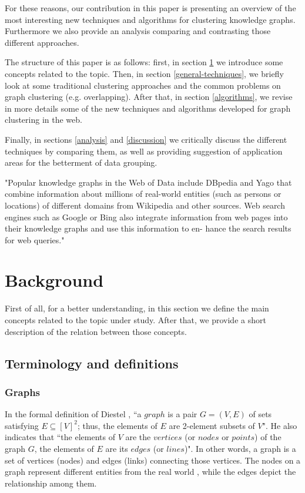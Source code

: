 \documentclass[runningheads]{llncs}
\begin{document}
For these reasons, our contribution in this paper is presenting an overview of the most interesting new techniques and algorithms for clustering knowledge graphs. Furthermore we also provide an analysis comparing and contrasting those different approaches.

The structure of this paper is as follows: first, in section \ref{background} we introduce some concepts related to the topic. Then, in section \ref{general-techniques}, we briefly look at some traditional clustering approaches and the common problems on graph clustering (e.g. overlapping). After that, in section \ref{algorithms}, we revise in more details some of the new techniques and algorithms developed for graph clustering in the web.

Finally, in sections \ref{analysis} and \ref{discussion} we critically discuss the different techniques by comparing them, as well as providing suggestion of application areas for the betterment of data grouping. 


"Popular knowledge graphs in the Web of Data include DBpedia and Yago that combine information about millions of real-world entities (such as persons or locations) of different domains from Wikipedia and other sources. Web search engines such as Google or Bing also integrate information from web pages into their knowledge graphs and use this information to en- hance the search results for web queries." \cite{Saeedi}

\section{Background} \label{background}
First of all, for a better understanding, in this section we define the main concepts related to the topic under study. After that, we provide a short description of the relation between those concepts.

\subsection{Terminology and definitions} \label{terminology}

\subsubsection{Graphs} \label{graphs}
In the formal definition of Diestel \cite{Diestel}, ``a $graph$ is a pair $G = (V, E)$ of sets satisfying $E \subseteq [V]^2$; thus, the elements of $E$ are 2-element subsets of $V$". He also indicates that ``the elements of $V$ are the $vertices$ (or $nodes$ or $points$) of the graph $G$, the elements of $E$ are its $edges$ (or $lines$)". In other words, a graph is a set of vertices (nodes) and edges (links) connecting those vertices. The nodes on a graph represent different entities from the real world \cite{Robinson}, while the edges depict the relationship among them.
\end{document}
